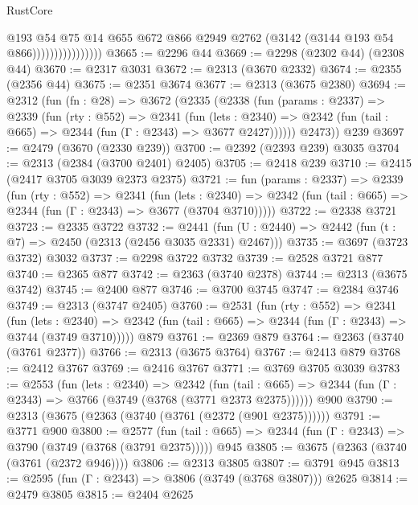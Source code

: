\begin{lexlean}{RustCore}
\begin{coremodule}
                                @193
                                @54
                                @75
                                @14
                                @655
                                @672
                                @866
                                @2949
                                @2762
                                (@3142 (@3144 @193 @54 @866))))))))))))))))
@3665 := @2296 @44
@3669 := @2298 (@2302 @44) (@2308 @44)
@3670 := @2317 @3031
@3672 := @2313 (@3670 @2332)
@3674 := @2355 (@2356 @44)
@3675 := @2351 @3674
@3677 := @2313 (@3675 @2380)
@3694 := @2312
    (fun (fn : @28) =>
    @3672
      (@2335
        (@2338
          (fun (params : @2337) =>
          @2339
            (fun (rty : @552) =>
            @2341
              (fun (lets : @2340) =>
              @2342 (fun (tail : @665) => @2344 (fun (Γ : @2343) => @3677 @2427))))))
        @2473))
    @239
@3697 := @2479 (@3670 (@2330 @239))
@3700 := @2392 (@2393 @239) @3035
@3704 := @2313 (@2384 (@3700 @2401) @2405)
@3705 := @2418 @239
@3710 := @2415 (@2417 @3705 @3039 @2373 @2375)
@3721 := fun (params : @2337) =>
  @2339
    (fun (rty : @552) =>
    @2341
      (fun (lets : @2340) =>
      @2342 (fun (tail : @665) => @2344 (fun (Γ : @2343) => @3677 (@3704 @3710)))))
@3722 := @2338 @3721
@3723 := @2335 @3722
@3732 := @2441 (fun (U : @2440) => @2442 (fun (t : @7) => @2450 (@2313 (@2456 @3035 @2331) @2467)))
@3735 := @3697 (@3723 @3732) @3032
@3737 := @2298 @3722 @3732
@3739 := @2528 @3721 @877
@3740 := @2365 @877
@3742 := @2363 (@3740 @2378)
@3744 := @2313 (@3675 @3742)
@3745 := @2400 @877
@3746 := @3700 @3745
@3747 := @2384 @3746
@3749 := @2313 (@3747 @2405)
@3760 := @2531
    (fun (rty : @552) =>
    @2341
      (fun (lets : @2340) =>
      @2342 (fun (tail : @665) => @2344 (fun (Γ : @2343) => @3744 (@3749 @3710)))))
    @879
@3761 := @2369 @879
@3764 := @2363 (@3740 (@3761 @2377))
@3766 := @2313 (@3675 @3764)
@3767 := @2413 @879
@3768 := @2412 @3767
@3769 := @2416 @3767
@3771 := @3769 @3705 @3039
@3783 := @2553
    (fun (lets : @2340) =>
    @2342
      (fun (tail : @665) => @2344 (fun (Γ : @2343) => @3766 (@3749 (@3768 (@3771 @2373 @2375))))))
    @900
@3790 := @2313 (@3675 (@2363 (@3740 (@3761 (@2372 (@901 @2375))))))
@3791 := @3771 @900
@3800 := @2577
    (fun (tail : @665) => @2344 (fun (Γ : @2343) => @3790 (@3749 (@3768 (@3791 @2375)))))
    @945
@3805 := @3675 (@2363 (@3740 (@3761 (@2372 @946))))
@3806 := @2313 @3805
@3807 := @3791 @945
@3813 := @2595 (fun (Γ : @2343) => @3806 (@3749 (@3768 @3807))) @2625
@3814 := @2479 @3805
@3815 := @2404 @2625

\end{coremodule}
\end{lexlean}
